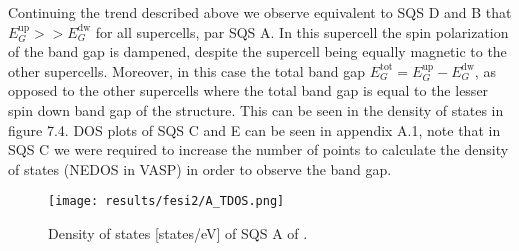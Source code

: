 Continuing the trend described above we observe equivalent to SQS D and B that $E_G ^\text{up} >> E_G ^\text{dw}$ for all supercells, par SQS A. In this supercell the spin polarization of the band gap is dampened, despite the supercell being equally magnetic to the other supercells. Moreover, in this case the total band gap $E_G ^\text{tot} =E_G ^\text{up} - E_G ^\text{dw}$, as opposed to the other supercells where the total band gap is equal to the lesser spin down band gap of the structure. This can be seen in the density of states in figure 7.4. DOS plots of SQS C and E can be seen in appendix A.1, note that in SQS C we were required to increase the number of points to calculate the density of states (NEDOS in VASP) in order to observe the band gap. 

\begin{figure}[H]
	\centering
	\texttt{[image: results/fesi2/A\_TDOS.png]}
	\caption{Density of states [states/eV] of SQS A of .}
\end{figure}


